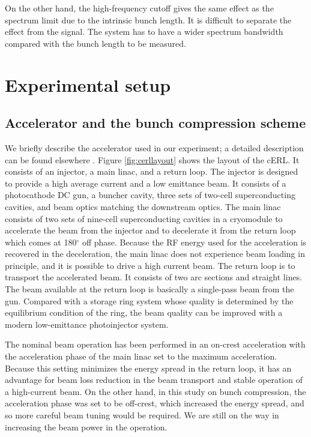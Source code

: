 \documentclass[review]{elsarticle}
\begin{document}
On the other hand,
the high-frequency cutoff 
gives the same effect as the spectrum limit due to the intrinsic bunch length.
It is difficult to separate the effect from the signal.
The system has to have a wider spectrum bandwidth
compared with the bunch length to be measured.



\section{Experimental setup}
\subsection{Accelerator and the bunch compression scheme}

We briefly describe the accelerator used in our experiment;
a detailed description can be found elsewhere
\cite{Sakanakun}.
Figure \ref{fig:cerllayout} shows the layout of the cERL.
It consists of an injector,
a main linac, and a return loop.
The injector is designed to provide a high average current and a low emittance beam.
It consists of a photocathode DC gun,
a buncher cavity, three sets of two-cell superconducting cavities,
and beam optics matching the downstream optics.
The main linac consists of two sets of nine-cell superconducting cavities in a cryomodule
to accelerate the beam from the injector
and to decelerate it from the return loop
which comes at 180$^{\circ}$ off phase.
Because the RF energy used for the acceleration
is recovered in the deceleration,
the main linac does not experience beam loading in principle,
and it is possible to drive a high current beam.
The return loop is to transport the accelerated beam.
It consists of two arc sections and straight lines.
The beam available at the return loop 
is basically a single-pass beam from the gun. 
Compared with a storage ring system
whose quality is determined by the equilibrium condition of the ring,
the beam quality can be improved with a modern low-emittance photoinjector system.

The nominal beam operation has been performed 
in an on-crest acceleration
with the acceleration phase of the main linac
set to the maximum acceleration.
Because this setting minimizes the energy spread in the return loop,
it has an advantage for beam loss reduction in the beam transport
and stable operation of a high-current beam.
On the other hand, in this study on bunch compression,
the acceleration phase was set to be off-crest,
which increased the energy spread,
and so more careful beam tuning would be required.
We are still on the way in increasing the beam power in the operation.
\end{document}
